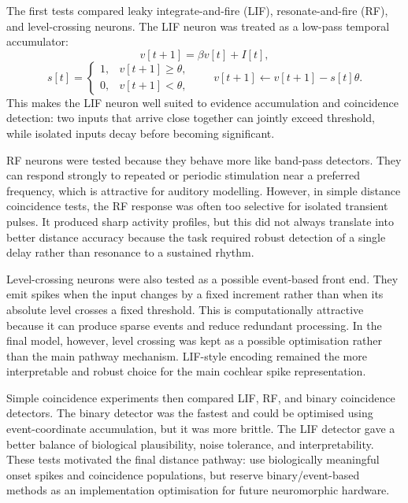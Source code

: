 The first tests compared leaky integrate-and-fire (LIF), resonate-and-fire (RF), and level-crossing neurons. The LIF neuron was treated as a low-pass temporal accumulator:
\begin{equation}
    v[t+1] = \beta v[t] + I[t],
\end{equation}
\begin{equation}
    s[t] =
    \begin{cases}
        1, & v[t+1] \geq \theta,\\
        0, & v[t+1] < \theta,
    \end{cases}
    \qquad
    v[t+1] \leftarrow v[t+1] - s[t]\theta.
\end{equation}
This makes the LIF neuron well suited to evidence accumulation and coincidence detection: two inputs that arrive close together can jointly exceed threshold, while isolated inputs decay before becoming significant.

RF neurons were tested because they behave more like band-pass detectors. They can respond strongly to repeated or periodic stimulation near a preferred frequency, which is attractive for auditory modelling. However, in simple distance coincidence tests, the RF response was often too selective for isolated transient pulses. It produced sharp activity profiles, but this did not always translate into better distance accuracy because the task required robust detection of a single delay rather than resonance to a sustained rhythm.

Level-crossing neurons were also tested as a possible event-based front end. They emit spikes when the input changes by a fixed increment rather than when its absolute level crosses a fixed threshold. This is computationally attractive because it can produce sparse events and reduce redundant processing. In the final model, however, level crossing was kept as a possible optimisation rather than the main pathway mechanism. LIF-style encoding remained the more interpretable and robust choice for the main cochlear spike representation.

Simple coincidence experiments then compared LIF, RF, and binary coincidence detectors. The binary detector was the fastest and could be optimised using event-coordinate accumulation, but it was more brittle. The LIF detector gave a better balance of biological plausibility, noise tolerance, and interpretability. These tests motivated the final distance pathway: use biologically meaningful onset spikes and coincidence populations, but reserve binary/event-based methods as an implementation optimisation for future neuromorphic hardware.

